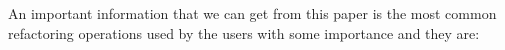 An important information that we can get from this paper is the most common refactoring operations used by the users with some importance and they are: 







